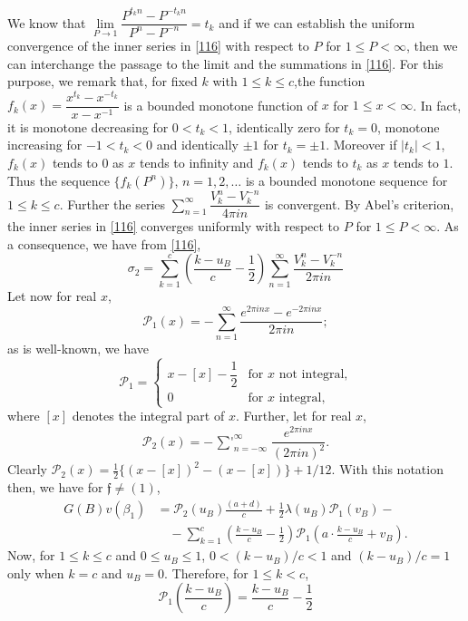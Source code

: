 We know that $\lim\limits_{P\to
  1}\dfrac{P^{t_{k}n}-P^{-t_{k}n}}{P^{n}-P^{-n}}=t_{k}$ and if we can
establish the uniform convergence of the inner series in \eqref{116}
with respect to $P$ for $1\leq P<\infty$, then we can interchange the
passage to the limit and the summations in \eqref{116}. For this
purpose, we remark that, for fixed $k$ with $1\leq k\leq
c$,\pageoriginale the function
$f_{k}(x)=\dfrac{x^{t_{k}}-x^{-t_{k}}}{x-x^{-1}}$ is a 
bounded monotone function of $x$ for $1\leq x<\infty$. In fact, it is
monotone decreasing for $0<t_{k}<1$, identically zero for $t_{k}=0$,
monotone increasing for $-1<t_{k}<0$ and identically $\pm 1$ for
$t_{k}=\pm 1$. Moreover if $|t_{k}|<1$, $f_{k}(x)$ tends to $0$ as $x$
tends  to infinity and $f_{k}(x)$ tends to $t_{k}$ as $x$ tends to
$1$. Thus the sequence $\{f_{k}(P^{n})\}$, $n=1,2,\ldots$ is a bounded
monotone sequence for $1\leq k\leq c$. Further the series
$\sum\limits^{\infty}_{n=1}\dfrac{V^{n}_{k}-V^{-n}_{k}}{4\pi in}$ is
convergent. By Abel's criterion, the inner series in \eqref{116}
converges uniformly with respect to $P$ for $1\leq P<\infty$. As a
consequence, we have from \eqref{116},
$$
\sigma_{2}=\sum^{c}_{k=1}\left(\frac{k-u_{B}}{c}-\frac{1}{2}\right)\sum^{\infty}_{n=1}\frac{V^{n}_{k}-V^{-n}_{k}}{2\pi
  in}
$$
Let now for real $x$,
$$
\mathscr{P}_{1}(x)=-\sum^{\infty}_{n=1}\dfrac{e^{2\pi inx}-e^{-2\pi
    inx}}{2\pi in}; 
$$ 
as is well-known, we have
$$
\mathscr{P}_{1}=
\begin{cases}
x-[x]-\dfrac{1}{2} & \text{for $x$ not integral,}\\
0 & \text{for $x$ integral,}
\end{cases}
$$
where $[x]$ denotes the integral part of $x$. Further, let for real
$x$,
$$
\mathscr{P}_{2}(x)=-\mathop{{\sum}'}^{\infty}_{n=-\infty}\frac{e^{2\pi
      inx}}{(2\pi in)^{2}}.
$$
Clearly
$\mathscr{P}_{2}(x)=\frac{1}{2}\{(x-[x])^{2}-(x-[x])\}+1/12$. With
this notation then, we have for $\mathfrak{f}\neq (1)$,
\begin{align*}
G(B)v(\beta_{1}) &=
\mathscr{P}_{2}(u_{B})\frac{(a+d)}{c}+\frac{1}{2}\lambda(u_{B})\mathscr{P}_{1}(v_{B})-\\
&\quad
-\sum^{c}_{k=1}\left(\frac{k-u_{B}}{c}-\frac{1}{2}\right)\mathscr{P}_{1}\left(a\cdot
\frac{k-u_{B}}{c}+v_{B}\right). 
\end{align*}
Now, for $1\leq k\leq c$ and $0\leq u_{B}\leq 1$, $0<(k-u_{B})/c<1$
and $(k-u_{B})/c=1$ only when $k=c$ and $u_{B}=0$. Therefore, for
$1\leq k<c$, 
$$
\mathscr{P}_{1}\left(\dfrac{k-u_{B}}{c}\right)=\frac{k-u_{B}}{c}-\frac{1}{2}
$$\pageoriginale
